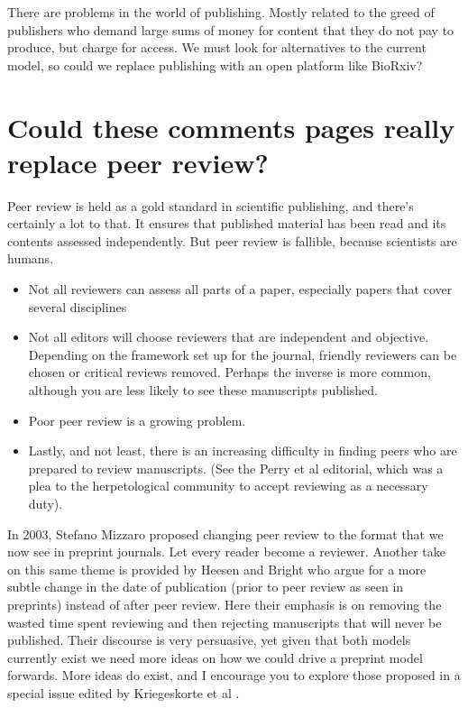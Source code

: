 \documentclass[
]{krantz}
\providecommand{\tightlist}{%
  \setlength{\itemsep}{0pt}\setlength{\parskip}{0pt}}
\begin{document}
There are problems in the world of publishing. Mostly related to the greed of publishers who demand large sums of money for content that they do not pay to produce, but charge for access. We must look for alternatives to the current model, so could we replace publishing with an open platform like BioRxiv?

\hypertarget{could-these-comments-pages-really-replace-peer-review}{%
\section{Could these comments pages really replace peer review?}\label{could-these-comments-pages-really-replace-peer-review}}

Peer review is held as a gold standard in scientific publishing, and there's certainly a lot to that. It ensures that published material has been read and its contents assessed independently. But peer review is fallible, because scientists are humans.

\begin{itemize}
\tightlist
\item
  Not all reviewers can assess all parts of a paper, especially papers that cover several disciplines
\item
  Not all editors will choose reviewers that are independent and objective. Depending on the framework set up for the journal, friendly reviewers can be chosen or critical reviews removed. Perhaps the inverse is more common, although you are less likely to see these manuscripts published.
\item
  Poor peer review is a growing problem.
\item
  Lastly, and not least, there is an increasing difficulty in finding peers who are prepared to review manuscripts. (See the Perry et al \citeyearpar{perry2012peer} editorial, which was a plea to the herpetological community to accept reviewing as a necessary duty).
\end{itemize}

In 2003, Stefano Mizzaro proposed changing peer review to the format that we now see in preprint journals. Let every reader become a reviewer. Another take on this same theme is provided by Heesen and Bright \citep{heesen2020peer} who argue for a more subtle change in the date of publication (prior to peer review as seen in preprints) instead of after peer review. Here their emphasis is on removing the wasted time spent reviewing and then rejecting manuscripts that will never be published. Their discourse is very persuasive, yet given that both models currently exist we need more ideas on how we could drive a preprint model forwards. More ideas do exist, and I encourage you to explore those proposed in a special issue edited by Kriegeskorte et al \citeyearpar{kriegeskorte2012emerging}.
\end{document}
